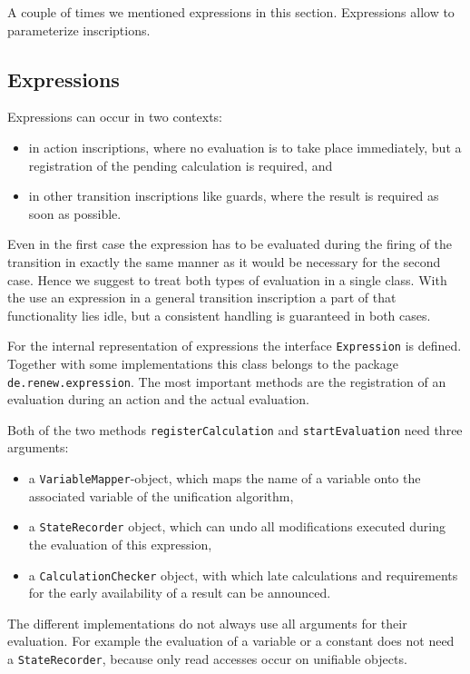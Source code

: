 A couple of times we mentioned expressions in this section.
Expressions allow to parameterize inscriptions.

\subsection{Expressions}

Expressions can occur in two contexts:
\begin{itemize}
\item in action inscriptions, where no 
  evaluation is to take place immediately,
  but a registration of the pending calculation is required, and
\item in other transition inscriptions like guards, where the result
  is required as soon as possible.
\end{itemize}


Even in the first case the expression has to be
evaluated during the firing of the transition in exactly the same manner
as it would be necessary for the second case. Hence we suggest
to treat both types of evaluation in a single class. With the use
an expression in a general transition inscription a part of that functionality
lies idle, but a consistent handling is guaranteed in both cases.

For the internal representation of expressions the interface
\texttt{Expression} is defined. Together with some
implementations this class 
belongs to the package \texttt{de.renew.expression}. The most
important methods are the registration of an evaluation during
an action and the actual evaluation.

Both of the two methods \texttt{registerCalculation} and
\texttt{startEvaluation} need three arguments:
\begin{itemize}
\item a \texttt{VariableMapper}-object, which maps the name of a
  variable onto the associated variable of the unification algorithm,
\item a \texttt{StateRecorder} object, which can undo all
  modifications executed during the evaluation of this expression,
\item a \texttt{CalculationChecker} object, with which late
  calculations and requirements for the early availability of a result
  can be announced.
\end{itemize}

The different implementations do not always use all arguments for
their evaluation. For example the evaluation of a variable or a constant
does not need a \texttt{StateRecorder}, because only read accesses
occur on unifiable objects.


